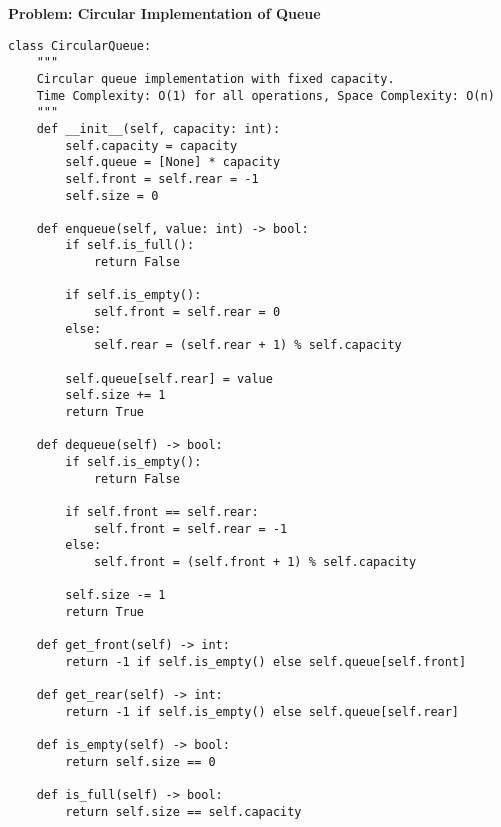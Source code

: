 % 
% 
\noindent\textbf{Problem: Circular Implementation of Queue}
\begin{verbatim}
class CircularQueue:
    """
    Circular queue implementation with fixed capacity.
    Time Complexity: O(1) for all operations, Space Complexity: O(n)
    """
    def __init__(self, capacity: int):
        self.capacity = capacity
        self.queue = [None] * capacity
        self.front = self.rear = -1
        self.size = 0

    def enqueue(self, value: int) -> bool:
        if self.is_full():
            return False
            
        if self.is_empty():
            self.front = self.rear = 0
        else:
            self.rear = (self.rear + 1) % self.capacity
            
        self.queue[self.rear] = value
        self.size += 1
        return True

    def dequeue(self) -> bool:
        if self.is_empty():
            return False
            
        if self.front == self.rear:
            self.front = self.rear = -1
        else:
            self.front = (self.front + 1) % self.capacity
            
        self.size -= 1
        return True

    def get_front(self) -> int:
        return -1 if self.is_empty() else self.queue[self.front]

    def get_rear(self) -> int:
        return -1 if self.is_empty() else self.queue[self.rear]

    def is_empty(self) -> bool:
        return self.size == 0

    def is_full(self) -> bool:
        return self.size == self.capacity
\end{verbatim}

